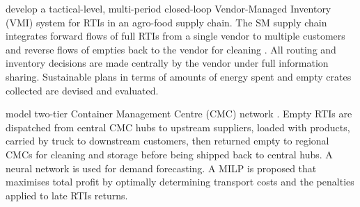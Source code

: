 %


\autocite{SOYSAL2023101504} develop a tactical-level, multi-period closed-loop Vendor-Managed Inventory (VMI) system for RTIs in an agro-food supply chain. The SM supply chain integrates forward flows of full RTIs from a single vendor to multiple customers and reverse flows of empties back to the vendor for cleaning . All routing and inventory decisions are made centrally by the vendor under full information sharing. Sustainable plans in terms of amounts of energy spent and empty crates collected are devised and evaluated.


\autocite{GUO2024104339} model two-tier Container Management Centre (CMC) network . Empty RTIs are dispatched from central CMC hubs to upstream suppliers, loaded with products, carried by truck to downstream customers, then returned empty to regional CMCs for cleaning and storage before being shipped back to central hubs. A neural network is used for demand forecasting. A MILP is proposed that maximises total profit by optimally determining transport costs and the penalties applied to late RTIs returns.


